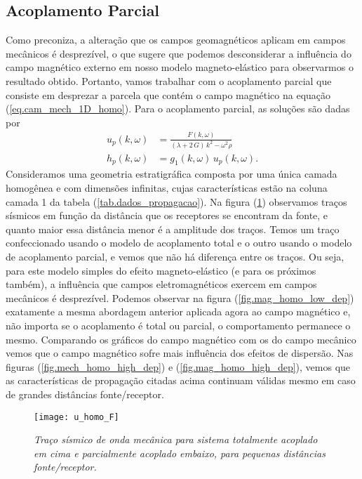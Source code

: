 \subsection{Acoplamento Parcial}
Como \cite{Knopoff_1955} preconiza, a altera\c{c}\~ao que os campos geomagn\'eticos aplicam em campos mec\^anicos \'e desprez\'ivel, o que sugere que podemos desconsiderar a influ\^encia do campo magn\'etico externo em nosso modelo magneto-el\'astico para observarmos o resultado obtido. Portanto, vamos trabalhar com o acoplamento parcial que consiste em desprezar a parcela que cont\'em o campo magn\'etico na equa\c{c}\~ao (\ref{eq.cam_mech_1D_homo}). Para o acoplamento parcial, as solu\c{c}\~oes s\~ao dadas por
\begin{align*}
u_p(k,\omega)&=\frac{F(k,\omega)}{(\lambda+2\,G)\,k^2-\omega^2\rho}\\
h_p(k,\omega)&=g_1(k,\omega)\,u_p(k,\omega).
\end{align*}
Consideramos uma geometria estratigr\'afica composta por uma \'unica camada homog\^enea e com dimens\~oes infinitas, cujas caracter\'isticas est\~ao na coluna camada 1 da tabela (\ref{tab.dados_propagacao}). Na figura (\ref{fig.mech_homo_low_dep}) observamos tra\c{c}os s\'ismicos em fun\c{c}\~ao da dist\^ancia que os receptores se encontram da fonte, e quanto maior essa dist\^ancia menor \'e a amplitude dos tra\c{c}os. Temos um tra\c{c}o confeccionado usando o modelo de acoplamento total e o outro usando o modelo de acoplamento parcial, e vemos que n\~ao h\'a diferen\c{c}a entre os tra\c{c}os. Ou seja, para este modelo simples do efeito magneto-el\'astico (e para os pr\'oximos tamb\'em), a influ\^encia que campos eletromagn\'eticos exercem em campos mec\^anicos \'e desprez\'ivel. Podemos observar na figura (\ref{fig.mag_homo_low_dep}) exatamente a mesma abordagem anterior aplicada agora ao campo magn\'etico e, n\~ao importa se o acoplamento \'e total ou parcial, o comportamento permanece o mesmo. Comparando os gr\'aficos do campo magn\'etico com os do campo mec\^anico vemos que o campo magn\'etico sofre mais influ\^encia dos efeitos de dispers\~ao. Nas figuras (\ref{fig.mech_homo_high_dep}) e (\ref{fig.mag_homo_high_dep}), vemos que as caracter\'isticas de propaga\c{c}\~ao citadas acima continuam v\'alidas mesmo em caso de grandes dist\^ancias fonte/receptor.

\begin{landscape}
\begin{figure}
\centering
\texttt{[image: u\_homo\_F]}
\caption{\textit{Tra\c{c}o s\'ismico de onda mec\^anica para sistema totalmente acoplado em cima e parcialmente acoplado embaixo, para pequenas dist\^ancias fonte/receptor.}}
\label{fig.mech_homo_low_dep}
\end{figure}
\end{landscape}

